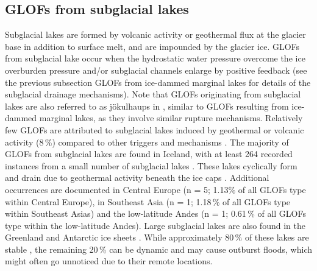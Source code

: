 \subsection{GLOFs from subglacial lakes}
\label{subsection:glofs_subglacial_lakes}


Subglacial lakes are formed by volcanic activity or geothermal flux at the glacier base in addition to surface melt, and are impounded by the glacier ice. GLOFs from subglacial lake occur when the hydrostatic water pressure overcome the ice overburden pressure and/or subglacial channels enlarge by positive feedback (see the previous subsection GLOFs from ice-dammed marginal lakes for details of the subglacial drainage mechanisms). Note that GLOFs originating from subglacial lakes are also referred to as jökulhaups in \cite{Bjornsson2010}, similar to GLOFs resulting from ice-dammed marginal lakes, as they involve similar rupture mechanisms. Relatively few GLOFs are attributed to subglacial lakes induced by geothermal or volcanic activity (8\,\%) compared to other triggers and mechanisms \citep{Lutzow&al2023}. The majority of GLOFs from subglacial lakes are found in Iceland, with at least 264 recorded instances from a small number of subglacial lakes \citep{Bjornsson2003}. These lakes cyclically form and drain due to geothermal activity beneath the ice caps \citep{Bjornsson&al2001}. Additional occurrences are documented in Central Europe (n = 5; 1.13\% of all GLOFs type within Central Europe), in
Southeast Asia (n = 1; 1.18\,\% of all GLOFs type within Southeast Asias) and the low-latitude Andes (n = 1; 0.61\,\% of all GLOFs type within the low-latitude Andes). Large subglacial lakes are also found in the Greenland and Antarctic ice sheets \citep{Siegert&al2016, Bowling&al2019}. While approximately 80\,\% of these lakes are stable \citep{Livingstone&al2022}, the remaining 20\,\% can be dynamic and may cause outburst floods, which might often go unnoticed due to their remote locations.

